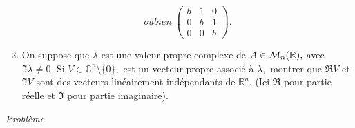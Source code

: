 \documentclass[12pt,a4paper]{article}
\begin{document}
\begin{enumerate}
$${  ou bien}\;
\left(\begin{array}{ccc}b&1&0\\0&b&1\\0&0&b\end{array}\right).$$
\item On suppose que $\lambda$ est une valeur propre complexe de $A\in
  {\cal M}_n(\mathbb R),$ avec $\Im \lambda\neq 0.$ Si $V\in \mathbb
  C^n\setminus\{0\},$ est un vecteur propre associé à $\lambda,$ montrer que $\Re V$ et $\Im V$ sont des vecteurs
  linéairement indépendants de $\mathbb R^n.$ (Ici $\Re$ pour partie
  réelle et $\Im$ pour partie imaginaire).
\end{enumerate}
\begin{center}
\vspace{5mm}
{\it Problème}
\end{center}
\end{document}
